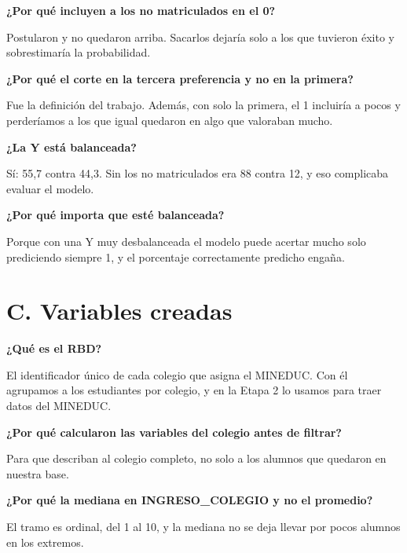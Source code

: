 \documentclass[11pt]{article}
\begin{document}
\textbf{¿Por qué incluyen a los no matriculados en el 0?}\par
\begin{guion}Postularon y no quedaron arriba. Sacarlos dejaría solo a los que tuvieron éxito y sobrestimaría la probabilidad.\end{guion}

\textbf{¿Por qué el corte en la tercera preferencia y no en la primera?}\par
\begin{guion}Fue la definición del trabajo. Además, con solo la primera, el 1 incluiría a pocos y perderíamos a los que igual quedaron en algo que valoraban mucho.\end{guion}

\textbf{¿La Y está balanceada?}\par
\begin{guion}Sí: 55,7 contra 44,3. Sin los no matriculados era 88 contra 12, y eso complicaba evaluar el modelo.\end{guion}

\textbf{¿Por qué importa que esté balanceada?}\par
\begin{guion}Porque con una Y muy desbalanceada el modelo puede acertar mucho solo prediciendo siempre 1, y el porcentaje correctamente predicho engaña.\end{guion}

\section*{C. Variables creadas}

\textbf{¿Qué es el RBD?}\par
\begin{guion}El identificador único de cada colegio que asigna el MINEDUC. Con él agrupamos a los estudiantes por colegio, y en la Etapa 2 lo usamos para traer datos del MINEDUC.\end{guion}

\textbf{¿Por qué calcularon las variables del colegio antes de filtrar?}\par
\begin{guion}Para que describan al colegio completo, no solo a los alumnos que quedaron en nuestra base.\end{guion}

\textbf{¿Por qué la mediana en INGRESO\_COLEGIO y no el promedio?}\par
\begin{guion}El tramo es ordinal, del 1 al 10, y la mediana no se deja llevar por pocos alumnos en los extremos.\end{guion}
\end{document}
